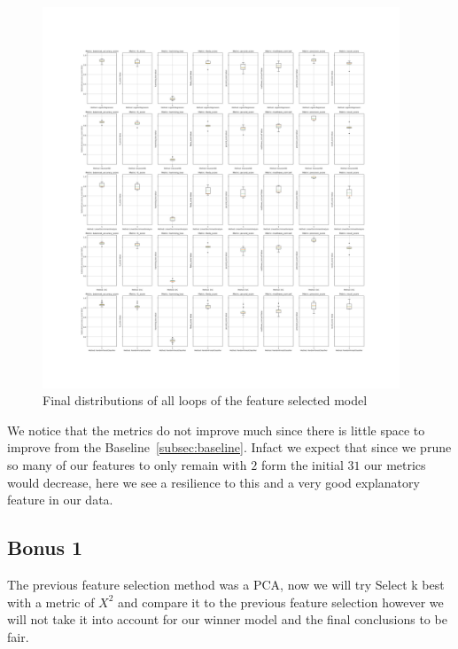 \documentclass[12pt, a4paper]{article}
\begin{document}
\begin{figure}[H]
    \begin{center}
        \includegraphics[width=0.95\textwidth]{figures/RNCV/FeatureSelection/All loop outer folds boxplots.png}
        \caption{Final distributions of all loops of the feature selected model}\label{fig:fs model desc}
    \end{center}
\end{figure}

\begin{multicols}{2}

    We notice that the metrics do not improve much since there is little space to improve from the Baseline~\ref{subsec:baseline}. Infact we expect that since we prune so many of our features to only remain with $2$ form the initial $31$ our metrics would decrease, here we see a resilience to this and a very good explanatory feature in our data.
    \newlin

    \subsection{Bonus 1} \label{subsec:bonus1}

    The previous feature selection method was a PCA, now we will try Select k best with a metric of $X^2$ and compare it to the previous feature selection however we will not take it into account for our winner model and the final conclusions to be fair.
    \newline

\end{multicols}
\end{document}
